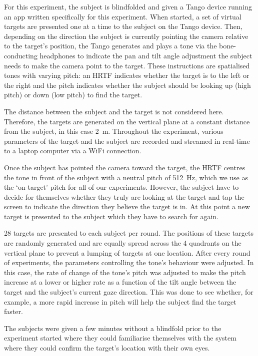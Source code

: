 \documentclass[format=sigconf, review=true, screen=true, anonymous=true]{acmart}
\begin{document}
For this experiment, the subject is blindfolded and given a Tango device running an app written specifically for this experiment. When started, a set of virtual targets are presented one at a time to the subject on the Tango device. Then, depending on the direction the subject is currently pointing the camera relative to the target's position, the Tango generates and plays a tone via the bone-conducting headphones to indicate the pan and tilt angle adjustment the subject needs to make the camera point to the target. These instructions are spatialised tones with varying pitch: an HRTF indicates whether the target is to the left or the right and the pitch indicates whether the subject should be looking up (high pitch) or down (low pitch) to find the target. 

The distance between the subject and the target is not considered here. Therefore, the targets are generated on the vertical plane at a constant distance from the subject, in this case \SI{2}{\m}. Throughout the experiment, various parameters of the target and the subject are recorded and streamed in real-time to a laptop computer via a WiFi connection.

Once the subject has pointed the camera toward the target, the HRTF centres the tone in front of the subject with a neutral pitch of \SI{512}{\hertz}, which we use as the `on-target' pitch for all of our experiments.  However, the subject have to decide for themselves whether they truly are looking at the target and tap the screen to indicate the direction they believe the target is in. At this point a new target is presented to the subject which they have to search for again. 

28 targets are presented to each subject per round. The positions of these targets are randomly generated and are equally spread across the 4 quadrants on the vertical plane to prevent a lumping of targets at one location. After every round of experiments, the parameters controlling the tone's behaviour were adjusted. In this case, the rate of change of the tone's pitch was adjusted to make the pitch increase at a lower or higher rate as a function of the tilt angle between the target and the subject's current gaze direction. This was done to see whether, for example, a more rapid increase in pitch will help the subject find the target faster. 

The subjects were given a few minutes without a blindfold prior to the experiment started where they could familiarise themselves with the system where they could confirm the target's location with their own eyes.
\end{document}
